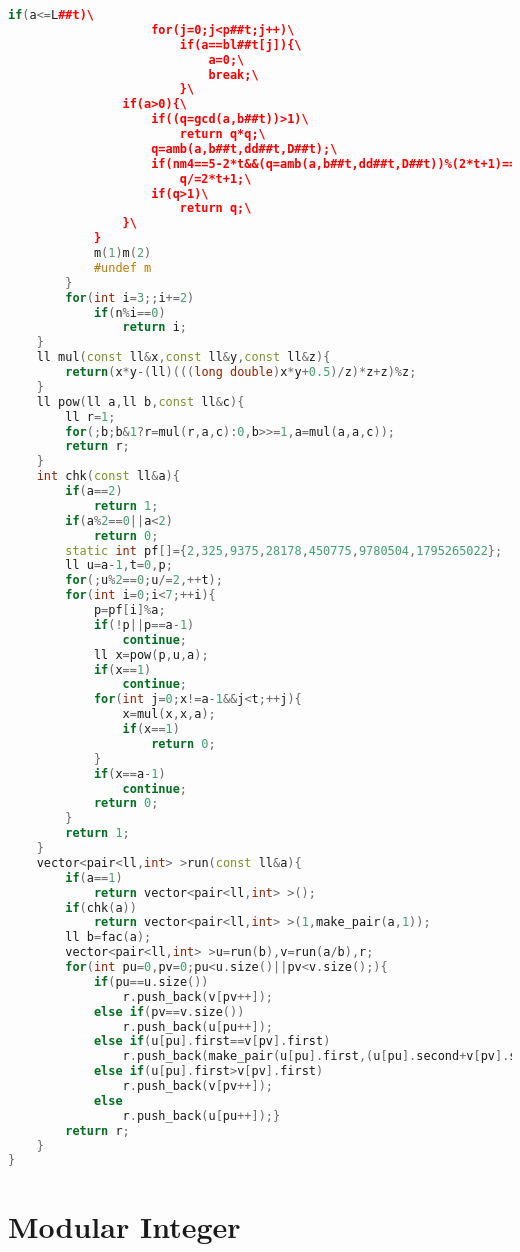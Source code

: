\documentclass{book}
\begin{document}
\begin{lstlisting}[language=C++,title={Integer Factorization (Shanks' Square Forms Factorization).hpp (4675 bytes, 147 lines)}]
                if(a<=L##t)\
                    for(j=0;j<p##t;j++)\
                        if(a==bl##t[j]){\
                            a=0;\
                            break;\
                        }\
                if(a>0){\
                    if((q=gcd(a,b##t))>1)\
                        return q*q;\
                    q=amb(a,b##t,dd##t,D##t);\
                    if(nm4==5-2*t&&(q=amb(a,b##t,dd##t,D##t))%(2*t+1)==0)\
                        q/=2*t+1;\
                    if(q>1)\
                        return q;\
                }\
            }
            m(1)m(2)
            #undef m
        }
        for(int i=3;;i+=2)
            if(n%i==0)
                return i;
    }
    ll mul(const ll&x,const ll&y,const ll&z){
        return(x*y-(ll)(((long double)x*y+0.5)/z)*z+z)%z;
    }
    ll pow(ll a,ll b,const ll&c){
        ll r=1;
        for(;b;b&1?r=mul(r,a,c):0,b>>=1,a=mul(a,a,c));
        return r;
    }
    int chk(const ll&a){
        if(a==2)
            return 1;
        if(a%2==0||a<2)
            return 0;
        static int pf[]={2,325,9375,28178,450775,9780504,1795265022};
        ll u=a-1,t=0,p;
        for(;u%2==0;u/=2,++t);
        for(int i=0;i<7;++i){
            p=pf[i]%a;
            if(!p||p==a-1)
                continue;
            ll x=pow(p,u,a);
            if(x==1)
                continue;
            for(int j=0;x!=a-1&&j<t;++j){
                x=mul(x,x,a);
                if(x==1)
                    return 0;
            }
            if(x==a-1)
                continue;
            return 0;
        }
        return 1;
    }
    vector<pair<ll,int> >run(const ll&a){
        if(a==1)
            return vector<pair<ll,int> >();
        if(chk(a))
            return vector<pair<ll,int> >(1,make_pair(a,1));
        ll b=fac(a);
        vector<pair<ll,int> >u=run(b),v=run(a/b),r;
        for(int pu=0,pv=0;pu<u.size()||pv<v.size();){
            if(pu==u.size())
                r.push_back(v[pv++]);
            else if(pv==v.size())
                r.push_back(u[pu++]);
            else if(u[pu].first==v[pv].first)
                r.push_back(make_pair(u[pu].first,(u[pu].second+v[pv].second))),++pu,++pv;
            else if(u[pu].first>v[pv].first)
                r.push_back(v[pv++]);
            else
                r.push_back(u[pu++]);}
        return r;
    }
}
\end{lstlisting}
\addtocontents{toc}{}
\section{Modular Integer}
\end{document}
